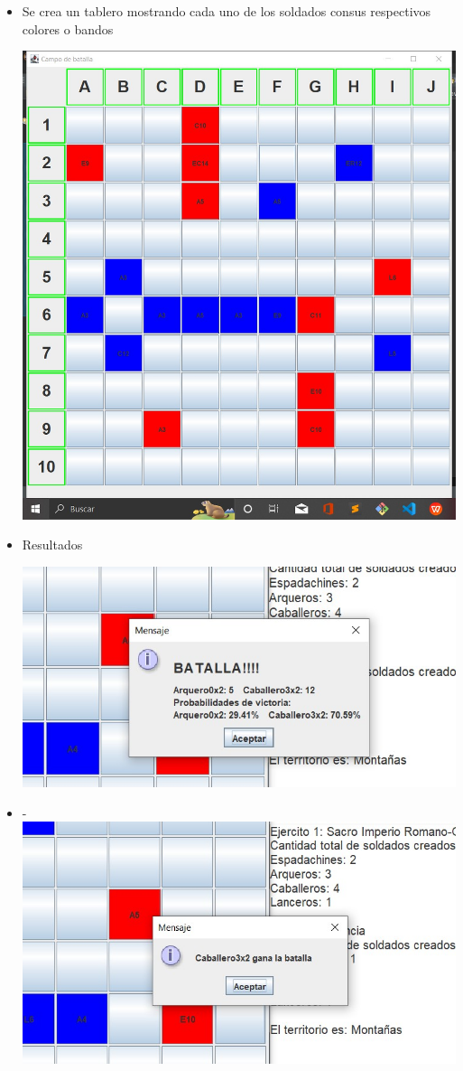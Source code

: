 \documentclass{article}
\begin{document}
	\begin{itemize}	
		\item Se crea un tablero  mostrando cada uno de los soldados consus respectivos colores o bandos
	
	\includegraphics[scale=0.45]{img/captura1.jpeg} 
\item Resultados

	\includegraphics[scale=0.5]{img/captura2.jpeg} 
	
	
\item -
	\includegraphics[scale=0.5]{img/captura3.jpeg} 
	\end{itemize}
	
\end{document}
